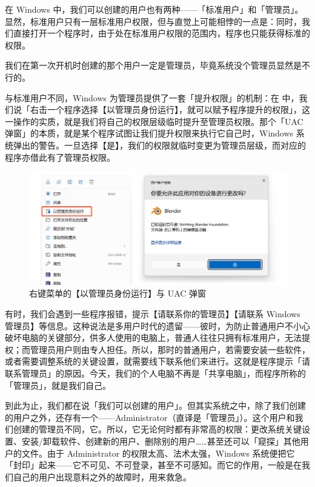 {{{在 Windows 中，我们可以创建的用户也有两种——「标准用户」和「管理员」。显然，标准用户只有一层标准用户权限，但与直觉上可能相悖的一点是：同时，我们直接打开一个程序时，由于处在标准用户权限的范围内，程序也只能获得标准的权限。

\begin{note}
  我们在第一次开机时创建的那个用户一定是管理员，毕竟系统没个管理员显然是不行的。
\end{note}

与标准用户不同，Windows 为管理员提供了一套「提升权限」的机制：在 中，我们说「右击一个程序选择【以管理员身份运行】，就可以赋予程序提升的权限」，这一操作的实质，就是我们将自己的权限层级临时提升至管理员权限。那个「UAC 弹窗」的本质，就是某个程序试图让我们提升权限来执行它自己时，Windows 系统弹出的警告。一旦选择【是】，我们的权限就临时变更为管理员层级，而对应的程序亦借此有了管理员权限。

\begin{figure}[htb!]
  \centering
  \includegraphics[width=.7\textwidth]{assets/advanced/Menu_and_UAC.png}
  \caption{右键菜单的【以管理员身份运行】与 UAC 弹窗}
  \label{fig:Menu_and_UAC}
\end{figure}

有时，我们会遇到一些程序报错，提示【请联系你的管理员】【请联系 Windows 管理员】等信息。这种说法是多用户时代的遗留——彼时，为防止普通用户不小心破坏电脑的关键部分，供多人使用的电脑上，普通人往往只拥有标准用户，无法提权；而管理员用户则由专人担任。所以，那时的普通用户，若需要安装一些软件，或者需要调整系统的关键设置，就需要线下联系他们来进行。这就是程序提示「请联系管理员」的原因。今天，我们的个人电脑不再是「共享电脑」，而程序所称的「管理员」，就是我们自己。

到此为止，我们都在说「我们可以创建的用户」。但其实系统之中，除了我们创建的用户之外，还存有一个——Administrator（直译是「管理员」）。这个用户和我们创建的管理员不同，它。所以，它无论何时都有非常高的权限：更改系统关键设置、安装/卸载软件、创建新的用户、删除别的用户……甚至还可以「窥探」其他用户的文件。由于 Administrator 的权限太高、法术太强，Windows 系统便把它「封印」起来——它不可见、不可登录，甚至不可感知。而它的作用，一般是在我们自己的用户出现意料之外的故障时，用来救急。

}}}

